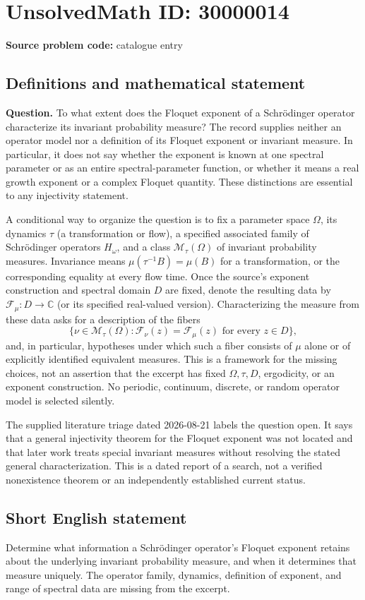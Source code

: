 \documentclass[11pt]{article}
\newcommand{\C}{\mathbb{C}}
\begin{document}
\section*{UnsolvedMath ID: 30000014}
\textbf{Source problem code:} catalogue entry
\subsection{Definitions and mathematical statement}
\textbf{Question.} To what extent does the Floquet exponent of a Schr\"odinger operator characterize its invariant probability measure? The record supplies neither an operator model nor a definition of its Floquet exponent or invariant measure. In particular, it does not say whether the exponent is known at one spectral parameter or as an entire spectral-parameter function, or whether it means a real growth exponent or a complex Floquet quantity. These distinctions are essential to any injectivity statement.\par A conditional way to organize the question is to fix a parameter space \(\Omega\), its dynamics \(\tau\) (a transformation or flow), a specified associated family of Schr\"odinger operators \(H_\omega\), and a class \(\mathcal M_\tau(\Omega)\) of invariant probability measures. Invariance means \(\mu(\tau^{-1}B)=\mu(B)\) for a transformation, or the corresponding equality at every flow time. Once the source's exponent construction and spectral domain \(D\) are fixed, denote the resulting data by \(\mathcal F_\mu:D\to\C\) (or its specified real-valued version). Characterizing the measure from these data asks for a description of the fibers\[\{\nu\in\mathcal M_\tau(\Omega):\mathcal F_\nu(z)=\mathcal F_\mu(z)\text{ for every }z\in D\},\] and, in particular, hypotheses under which such a fiber consists of \(\mu\) alone or of explicitly identified equivalent measures. This is a framework for the missing choices, not an assertion that the excerpt has fixed \(\Omega,\tau,D\), ergodicity, or an exponent construction. No periodic, continuum, discrete, or random operator model is selected silently.\par The supplied literature triage dated 2026-08-21 labels the question open. It says that a general injectivity theorem for the Floquet exponent was not located and that later work treats special invariant measures without resolving the stated general characterization. This is a dated report of a search, not a verified nonexistence theorem or an independently established current status.
\subsection{Short English statement}
Determine what information a Schr\"odinger operator's Floquet exponent retains about the underlying invariant probability measure, and when it determines that measure uniquely. The operator family, dynamics, definition of exponent, and range of spectral data are missing from the excerpt.
\end{document}
